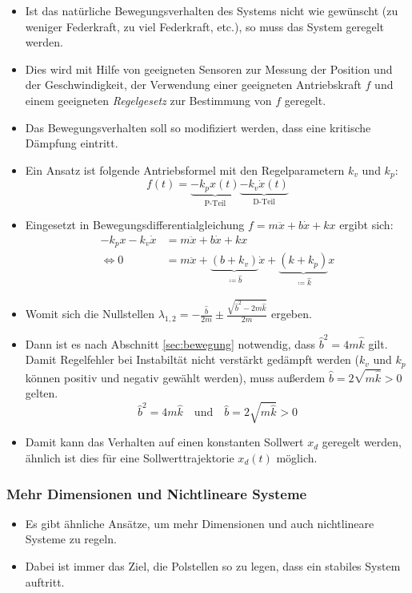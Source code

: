 				\begin{itemize}
					\item Ist das natürliche Bewegungsverhalten des Systems nicht wie gewünscht (zu weniger Federkraft, zu viel Federkraft, etc.), so muss das System geregelt werden.
					\item Dies wird mit Hilfe von geeigneten Sensoren zur Messung der Position und der Geschwindigkeit, der Verwendung einer geeigneten Antriebskraft \(f\) und einem geeigneten \textit{Regelgesetz} zur Bestimmung von \(f\) geregelt.
					\item Das Bewegungsverhalten soll so modifiziert werden, dass eine kritische Dämpfung eintritt.
					\item Ein Ansatz ist folgende Antriebsformel mit den Regelparametern \( k _ v \) und \( k _ p \):
						\begin{equation*}
							f(t) = \underbrace{-k_px(t)}_{\text{P-Teil}} \underbrace{-k_v\dot{x}(t)}_{\text{D-Teil}}
						\end{equation*}
					\item Eingesetzt in Bewegungsdifferentialgleichung \( f = m\ddot{x} + b\dot{x} + kx \) ergibt sich:
						\begin{align*}
							     -k_px -k_v\dot{x} &= m\ddot{x} + b\dot{x} + kx \\
							\iff 0 &= m\ddot{x} + \underbrace{(b + k_v)}_{ \coloneqq \hat{b} }\dot{x} + \underbrace{(k + k_p)}_{ \coloneqq \hat{k} }x
						\end{align*}
					\item Womit sich die Nullstellen \( \lambda _ { 1, 2 } = -\frac{\hat{b}}{2m} \pm \frac{\sqrt{\hat{b}^2 - 2m\hat{k}}}{2m} \) ergeben.
					\item Dann ist es nach Abschnitt \ref{sec:bewegung} notwendig, dass \( \hat{b}^2 = 4m\hat{k} \) gilt. Damit Regelfehler bei Instabiltät nicht verstärkt gedämpft werden (\( k_v \) und \( k_p \) können positiv und negativ gewählt werden), muss außerdem \( \hat{b} = 2\sqrt{m\hat{k}} > 0 \) gelten.
						\begin{equation*}
							\hat{b}^2 = 4m\hat{k} \quad\text{und}\quad \hat{b} = 2\sqrt{m\hat{k}} > 0
						\end{equation*}
					\item Damit kann das Verhalten auf einen konstanten Sollwert \( x _ d \) geregelt werden, ähnlich ist dies für eine Sollwerttrajektorie \( x _ d (t) \) möglich.
				\end{itemize}
			
			\subsubsection{Mehr Dimensionen und Nichtlineare Systeme}
				\begin{itemize}
					\item Es gibt ähnliche Ansätze, um mehr Dimensionen und auch nichtlineare Systeme zu regeln.
					\item Dabei ist immer das Ziel, die Polstellen so zu legen, dass ein stabiles System auftritt.
				\end{itemize}

